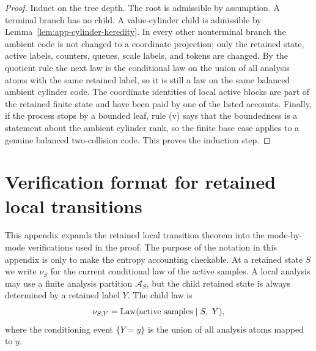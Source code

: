 \documentclass[11pt]{article}
\theoremstyle{remark}
\newcommand{\Law}{\operatorname{Law}}
\begin{document}
\begin{proof}
Induct on the tree depth.  The root is admissible by assumption.  A terminal branch has no child.  A value-cylinder child is admissible by Lemma~\ref{lem:app-cylinder-heredity}.  In every other nonterminal branch the ambient code is not changed to a coordinate projection; only the retained state, active labels, counters, queues, scale labels, and tokens are changed.  By the quotient rule the next law is the conditional law on the union of all analysis atoms with the same retained label, so it is still a law on the same balanced ambient cylinder code.  The coordinate identities of local active blocks are part of the retained finite state and have been paid by one of the listed accounts.  Finally, if the process stops by a bounded leaf, rule (v) says that the boundedness is a statement about the ambient cylinder rank, so the finite base case applies to a genuine balanced two-collision code.  This proves the induction step.
\end{proof}

\section{Verification format for retained local transitions}\label{app:verification-format}

This appendix expands the retained local transition theorem into the mode-by-mode verifications used in the proof.  The purpose of the notation in this appendix is only to make the entropy accounting checkable.  At a retained state $S$ we write $\nu_S$ for the current conditional law of the active samples.  A local analysis may use a finite analysis partition $\mathcal A_S$, but the child retained state is always determined by a retained label $Y$.  The child law is
\[
        \nu_{S,Y}=\Law(\hbox{active samples}\mid S,\ Y),
\]
where the conditioning event $\{Y=y\}$ is the union of all analysis atoms mapped to $y$.
\end{document}
